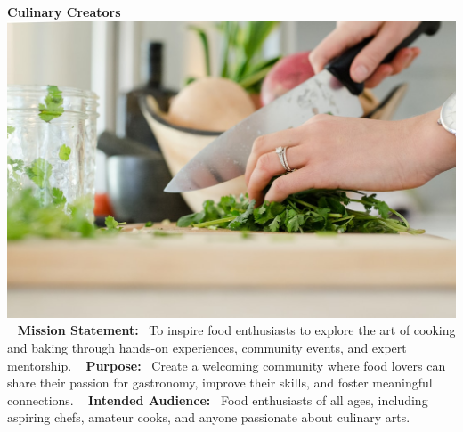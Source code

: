 \documentclass[12pt]{article}
\begin{document}
        \begin{center}
        \textbf{\Huge Culinary Creators} \
        \vspace{0.5in}
        \includegraphics[width=0.8	extwidth]{images/cooking.jpg} \
        \vspace{0.5in}
        \textbf{\Large Mission Statement:} \
        To inspire food enthusiasts to explore the art of cooking and baking through hands-on experiences, community events, and expert mentorship. \
        \vspace{0.25in}
        \textbf{\Large Purpose:} \
        Create a welcoming community where food lovers can share their passion for gastronomy, improve their skills, and foster meaningful connections. \
        \vspace{0.25in}
        \textbf{\Large Intended Audience:} \
        Food enthusiasts of all ages, including aspiring chefs, amateur cooks, and anyone passionate about culinary arts.
        \end{center}
        
\end{document}
